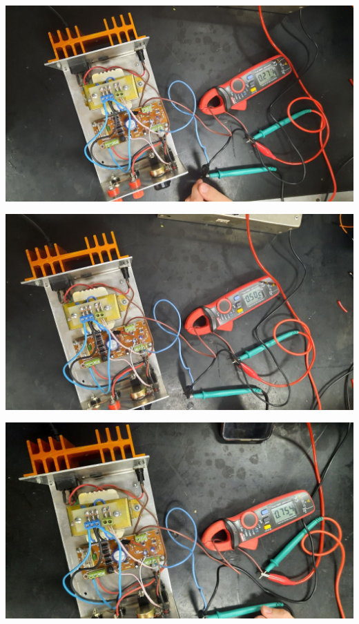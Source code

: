 \begin{center}
    \centering
    \includegraphics[width=0.9\linewidth]{./imagenes/corriente_baja_0,25.jpg}
\end{center}

\begin{center}
    \centering
    \includegraphics[width=0.9\linewidth]{./imagenes/corriente_baja_050.jpg}
\end{center}

\begin{center}
    \centering
    \includegraphics[width=0.9\linewidth]{./imagenes/corriente_baja_075.jpg}
\end{center}

